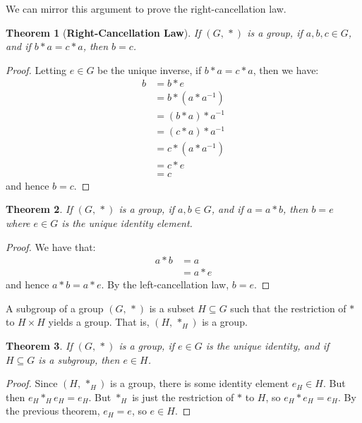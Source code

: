 \documentclass{article}
\theoremstyle{plain}
\newtheorem{theorem}{Theorem}[section]
\theoremstyle{normal}
\newenvironment{definition}{%
    \pushQED{\qed}\renewcommand{\qedsymbol}{$\blacksquare$}\definitionx%
}{%
    \popQED\enddefinitionx%
}
\begin{document}
        We can mirror this argument to prove the right-cancellation law.
        \begin{theorem}[\textbf{Right-Cancellation Law}]
            If $(G,\,*)$ is a group, if $a,b,c\in{G}$, and if $b*a=c*a$, then
            $b=c$.
        \end{theorem}
        \begin{proof}
            Letting $e\in{G}$ be the unique inverse, if $b*a=c*a$, then we have:
            \begin{align}
                b&=b*e\tag{Identity}\\
                &=b*(a*a^{-1})\tag{Inverse}\\
                &=(b*a)*a^{-1}\tag{Associativity}\\
                &=(c*a)*a^{-1}\tag{Hypothesis}\\
                &=c*(a*a^{-1})\tag{Associativity}\\
                &=c*e\tag{Inverse}\\
                &=c\tag{Identity}
            \end{align}
            and hence $b=c$.
        \end{proof}
        \begin{theorem}
            If $(G,\,*)$ is a group, if $a,b\in{G}$, and if
            $a=a*b$, then $b=e$ where $e\in{G}$ is the unique identity element.
        \end{theorem}
        \begin{proof}
            We have that:
            \begin{align}
                a*b&=a\tag{Hypothesis}\\
                &=a*e\tag{Identity}
            \end{align}
            and hence $a*b=a*e$. By the left-cancellation law, $b=e$.
        \end{proof}
        \begin{definition}[\textbf{Subgroup}]
            A subgroup of a group $(G,\,*)$ is a subset $H\subseteq{G}$ such
            that the restriction of $*$ to $H\times{H}$ yields a group. That
            is, $(H,\,*_{H})$ is a group.
        \end{definition}
        \begin{theorem}
            If $(G,\,*)$ is a group, if $e\in{G}$ is the unique identity, and
            if $H\subseteq{G}$ is a subgroup, then $e\in{H}$.
        \end{theorem}
        \begin{proof}
            Since $(H,\,*_{H})$ is a group, there is some identity element
            $e_{H}\in{H}$. But then $e_{H}*_{H}e_{H}=e_{H}$. But
            $*_{H}$ is just the restriction of $*$ to $H$, so
            $e_{H}*e_{H}=e_{H}$. By the previous theorem, $e_{H}=e$, so
            $e\in{H}$.
        \end{proof}
\end{document}
